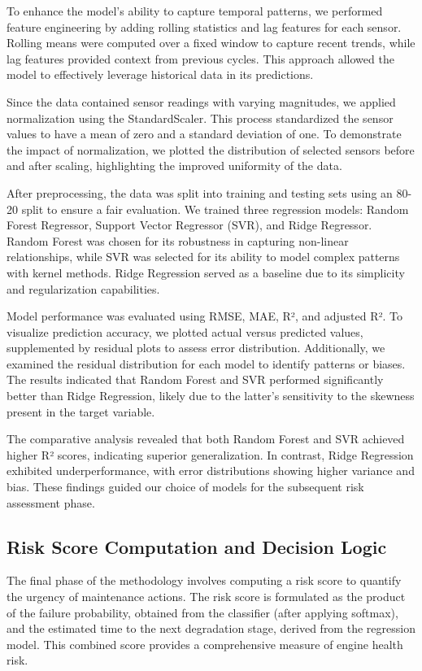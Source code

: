 \documentclass[conference]{IEEEtran}
\begin{document}
To enhance the model's ability to capture temporal patterns, we performed feature engineering by adding rolling statistics and lag features for each sensor. Rolling means were computed over a fixed window to capture recent trends, while lag features provided context from previous cycles. This approach allowed the model to effectively leverage historical data in its predictions.

Since the data contained sensor readings with varying magnitudes, we applied normalization using the StandardScaler. This process standardized the sensor values to have a mean of zero and a standard deviation of one. To demonstrate the impact of normalization, we plotted the distribution of selected sensors before and after scaling, highlighting the improved uniformity of the data.

After preprocessing, the data was split into training and testing sets using an 80-20 split to ensure a fair evaluation. We trained three regression models: Random Forest Regressor, Support Vector Regressor (SVR), and Ridge Regressor. Random Forest was chosen for its robustness in capturing non-linear relationships, while SVR was selected for its ability to model complex patterns with kernel methods. Ridge Regression served as a baseline due to its simplicity and regularization capabilities.

Model performance was evaluated using RMSE, MAE, R², and adjusted R². To visualize prediction accuracy, we plotted actual versus predicted values, supplemented by residual plots to assess error distribution. Additionally, we examined the residual distribution for each model to identify patterns or biases. The results indicated that Random Forest and SVR performed significantly better than Ridge Regression, likely due to the latter's sensitivity to the skewness present in the target variable.

The comparative analysis revealed that both Random Forest and SVR achieved higher R² scores, indicating superior generalization. In contrast, Ridge Regression exhibited underperformance, with error distributions showing higher variance and bias. These findings guided our choice of models for the subsequent risk assessment phase.


\subsection{Risk Score Computation and Decision Logic}
The final phase of the methodology involves computing a risk score to quantify the urgency of maintenance actions. The risk score is formulated as the product of the failure probability, obtained from the classifier (after applying softmax), and the estimated time to the next degradation stage, derived from the regression model. This combined score provides a comprehensive measure of engine health risk.
\end{document}
